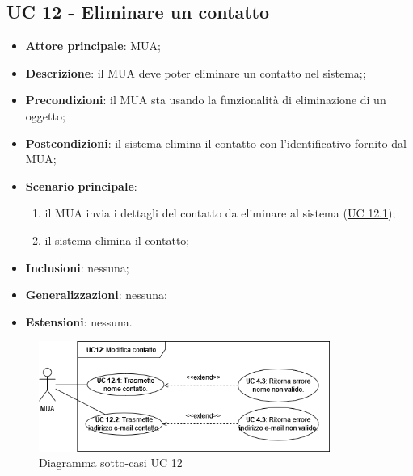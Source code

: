 \subsection{UC 12 - Eliminare un contatto} \label{sec:UC12}
    \begin{itemize}
        \item \textbf{Attore principale}: MUA;
        \item \textbf{Descrizione}: il MUA deve poter eliminare un contatto nel sistema;;
        \item \textbf{Precondizioni}: il MUA sta usando la funzionalità di eliminazione di un oggetto;
        \item \textbf{Postcondizioni}: il sistema elimina il contatto con l'identificativo fornito dal MUA;
        \item \textbf{Scenario principale}:
            \begin{enumerate}
                \item il MUA invia i dettagli del contatto da eliminare al sistema (\hyperref[sec:UC12.1]{UC 12.1});
                \item il sistema elimina il contatto;
            \end{enumerate}
        \item \textbf{Inclusioni}: nessuna;
        \item \textbf{Generalizzazioni}: nessuna;
        \item \textbf{Estensioni}: nessuna.
    \end{itemize}

\begin{figure}[h]
    \includegraphics[width=0.85\textwidth]{sections/uc_imgs/UC12.png}
    \centering
    \caption{Diagramma sotto-casi UC 12}
\end{figure}

